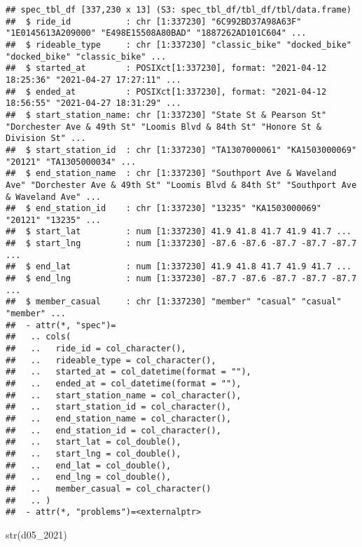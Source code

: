 \documentclass[
]{article}
\newenvironment{Shaded}{\begin{snugshade}}{\end{snugshade}}
\newcommand{\FunctionTok}[1]{\textcolor[rgb]{0.00,0.00,0.00}{#1}}
\newcommand{\NormalTok}[1]{#1}
\begin{document}
\begin{verbatim}
## spec_tbl_df [337,230 x 13] (S3: spec_tbl_df/tbl_df/tbl/data.frame)
##  $ ride_id           : chr [1:337230] "6C992BD37A98A63F" "1E0145613A209000" "E498E15508A80BAD" "1887262AD101C604" ...
##  $ rideable_type     : chr [1:337230] "classic_bike" "docked_bike" "docked_bike" "classic_bike" ...
##  $ started_at        : POSIXct[1:337230], format: "2021-04-12 18:25:36" "2021-04-27 17:27:11" ...
##  $ ended_at          : POSIXct[1:337230], format: "2021-04-12 18:56:55" "2021-04-27 18:31:29" ...
##  $ start_station_name: chr [1:337230] "State St & Pearson St" "Dorchester Ave & 49th St" "Loomis Blvd & 84th St" "Honore St & Division St" ...
##  $ start_station_id  : chr [1:337230] "TA1307000061" "KA1503000069" "20121" "TA1305000034" ...
##  $ end_station_name  : chr [1:337230] "Southport Ave & Waveland Ave" "Dorchester Ave & 49th St" "Loomis Blvd & 84th St" "Southport Ave & Waveland Ave" ...
##  $ end_station_id    : chr [1:337230] "13235" "KA1503000069" "20121" "13235" ...
##  $ start_lat         : num [1:337230] 41.9 41.8 41.7 41.9 41.7 ...
##  $ start_lng         : num [1:337230] -87.6 -87.6 -87.7 -87.7 -87.7 ...
##  $ end_lat           : num [1:337230] 41.9 41.8 41.7 41.9 41.7 ...
##  $ end_lng           : num [1:337230] -87.7 -87.6 -87.7 -87.7 -87.7 ...
##  $ member_casual     : chr [1:337230] "member" "casual" "casual" "member" ...
##  - attr(*, "spec")=
##   .. cols(
##   ..   ride_id = col_character(),
##   ..   rideable_type = col_character(),
##   ..   started_at = col_datetime(format = ""),
##   ..   ended_at = col_datetime(format = ""),
##   ..   start_station_name = col_character(),
##   ..   start_station_id = col_character(),
##   ..   end_station_name = col_character(),
##   ..   end_station_id = col_character(),
##   ..   start_lat = col_double(),
##   ..   start_lng = col_double(),
##   ..   end_lat = col_double(),
##   ..   end_lng = col_double(),
##   ..   member_casual = col_character()
##   .. )
##  - attr(*, "problems")=<externalptr>
\end{verbatim}

\begin{Shaded}
\begin{Highlighting}[]
\FunctionTok{str}\NormalTok{(d05\_2021)}
\end{Highlighting}
\end{Shaded}
\end{document}
